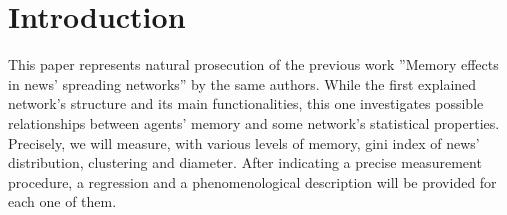 \section{Introduction}
This paper represents natural prosecution of the previous work ''Memory effects in news' spreading networks'' by the same authors.
While the first explained network's structure and its main functionalities, this one investigates possible relationships between agents' memory and some network's statistical properties.
Precisely, we will measure, with various levels of memory, gini index of news' distribution, clustering and diameter.
After indicating a precise measurement procedure, a regression and a phenomenological description will be provided for each one of them.